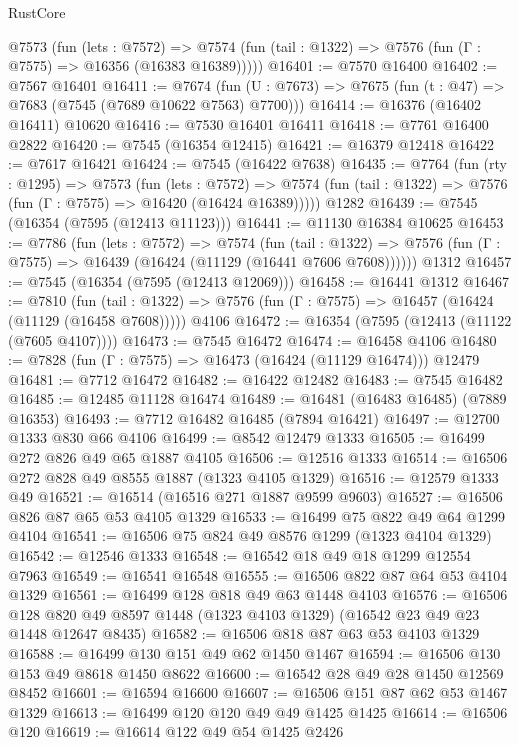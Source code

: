 \begin{lexlean}{RustCore}
\begin{coremodule}
    @7573
      (fun (lets : @7572) =>
      @7574 (fun (tail : @1322) => @7576 (fun (Γ : @7575) => @16356 (@16383 @16389)))))
@16401 := @7570 @16400
@16402 := @7567 @16401
@16411 := @7674
    (fun (U : @7673) => @7675 (fun (t : @47) => @7683 (@7545 (@7689 @10622 @7563) @7700)))
@16414 := @16376 (@16402 @16411) @10620
@16416 := @7530 @16401 @16411
@16418 := @7761 @16400 @2822
@16420 := @7545 (@16354 @12415)
@16421 := @16379 @12418
@16422 := @7617 @16421
@16424 := @7545 (@16422 @7638)
@16435 := @7764
    (fun (rty : @1295) =>
    @7573
      (fun (lets : @7572) =>
      @7574 (fun (tail : @1322) => @7576 (fun (Γ : @7575) => @16420 (@16424 @16389)))))
    @1282
@16439 := @7545 (@16354 (@7595 (@12413 @11123)))
@16441 := @11130 @16384 @10625
@16453 := @7786
    (fun (lets : @7572) =>
    @7574
      (fun (tail : @1322) =>
      @7576 (fun (Γ : @7575) => @16439 (@16424 (@11129 (@16441 @7606 @7608))))))
    @1312
@16457 := @7545 (@16354 (@7595 (@12413 @12069)))
@16458 := @16441 @1312
@16467 := @7810
    (fun (tail : @1322) => @7576 (fun (Γ : @7575) => @16457 (@16424 (@11129 (@16458 @7608)))))
    @4106
@16472 := @16354 (@7595 (@12413 (@11122 (@7605 @4107))))
@16473 := @7545 @16472
@16474 := @16458 @4106
@16480 := @7828 (fun (Γ : @7575) => @16473 (@16424 (@11129 @16474))) @12479
@16481 := @7712 @16472
@16482 := @16422 @12482
@16483 := @7545 @16482
@16485 := @12485 @11128 @16474
@16489 := @16481 (@16483 @16485) (@7889 @16353)
@16493 := @7712 @16482 @16485 (@7894 @16421)
@16497 := @12700 @1333 @830 @66 @4106
@16499 := @8542 @12479 @1333
@16505 := @16499 @272 @826 @49 @65 @1887 @4105
@16506 := @12516 @1333
@16514 := @16506 @272 @828 @49 @8555 @1887 (@1323 @4105 @1329)
@16516 := @12579 @1333 @49
@16521 := @16514 (@16516 @271 @1887 @9599 @9603)
@16527 := @16506 @826 @87 @65 @53 @4105 @1329
@16533 := @16499 @75 @822 @49 @64 @1299 @4104
@16541 := @16506 @75 @824 @49 @8576 @1299 (@1323 @4104 @1329)
@16542 := @12546 @1333
@16548 := @16542 @18 @49 @18 @1299 @12554 @7963
@16549 := @16541 @16548
@16555 := @16506 @822 @87 @64 @53 @4104 @1329
@16561 := @16499 @128 @818 @49 @63 @1448 @4103
@16576 := @16506
    @128
    @820
    @49
    @8597
    @1448
    (@1323 @4103 @1329)
    (@16542 @23 @49 @23 @1448 @12647 @8435)
@16582 := @16506 @818 @87 @63 @53 @4103 @1329
@16588 := @16499 @130 @151 @49 @62 @1450 @1467
@16594 := @16506 @130 @153 @49 @8618 @1450 @8622
@16600 := @16542 @28 @49 @28 @1450 @12569 @8452
@16601 := @16594 @16600
@16607 := @16506 @151 @87 @62 @53 @1467 @1329
@16613 := @16499 @120 @120 @49 @49 @1425 @1425
@16614 := @16506 @120
@16619 := @16614 @122 @49 @54 @1425 @2426

\end{coremodule}
\end{lexlean}
